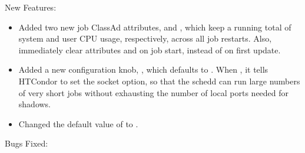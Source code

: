 \noindent New Features:

\begin{itemize}

\item Added two new job ClassAd attributes,  and
, which keep a running total of system and user
CPU usage, respectively, across all job restarts.  Also, immediately clear attributes
 and  on job start, instead of on first update.

\item Added a new configuration knob, , which defaults
to .  When , it tells HTCondor to set the
 socket option, so that
the schedd can run large numbers of very short jobs without exhausting the
number of local ports needed for shadows.

\item Changed the default value of  to .

\end{itemize}

\noindent Bugs Fixed:


